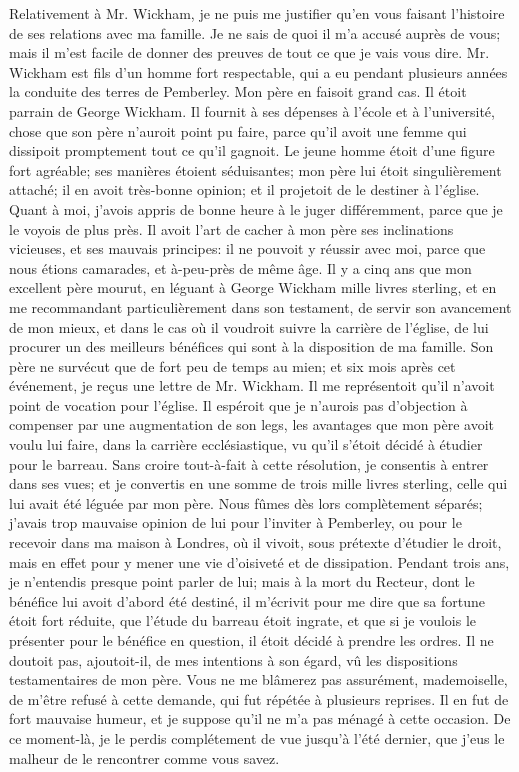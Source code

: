 Relativement à Mr. Wickham, je ne puis me justifier qu'en vous faisant l'histoire de ses relations avec ma famille. Je ne sais de quoi il m'a accusé auprès de vous; mais il m'est facile de donner des preuves de tout ce que je vais vous dire. Mr. Wickham est fils d'un homme fort respectable, qui a eu pendant plusieurs années la conduite des terres de Pemberley. Mon père en faisoit grand cas. Il étoit parrain de George Wickham. Il fournit à ses dépenses à l'école et à l'université, chose que son père n'auroit point pu faire, parce qu'il avoit une femme qui dissipoit promptement tout ce qu'il gagnoit. Le jeune homme étoit d'une figure fort agréable; ses manières étoient séduisantes; mon père lui étoit singulièrement\setcounter{page}{95} attaché; il en avoit très-bonne opinion; et il projetoit de le destiner à l'église. Quant à moi, j'avois appris de bonne heure à le juger différemment, parce que je le voyois de plus près. Il avoit l'art de cacher à mon père ses inclinations vicieuses, et ses mauvais principes: il ne pouvoit y réussir avec moi, parce que nous étions camarades, et à-peu-près de même âge.
Il y a cinq ans que mon excellent père mourut, en léguant à George Wickham mille livres sterling, et en me recommandant particulièrement dans son testament, de servir son avancement de mon mieux, et dans le cas où il voudroit suivre la carrière de l'église, de lui procurer un des meilleurs bénéfices qui sont à la disposition de ma famille. Son père ne survécut que de fort peu de temps au mien; et six mois après cet événement, je reçus une lettre de Mr. Wickham. Il me représentoit qu'il n'avoit point de vocation pour l'église. Il espéroit que je n'aurois pas d'objection à compenser par une augmentation de son legs, les avantages que mon père avoit voulu lui faire, dans la carrière ecclésiastique, vu qu'il s'étoit décidé à étudier pour le barreau. Sans croire tout-à-fait à cette résolution, je consentis à entrer dans ses vues; et je convertis en une somme\setcounter{page}{96} de trois mille livres sterling, celle qui lui avait été léguée par mon père. Nous fûmes dès lors complètement séparés; j'avais trop mauvaise opinion de lui pour l'inviter à Pemberley, ou pour le recevoir dans ma maison à Londres, où il vivoit, sous prétexte d'étudier le droit, mais en effet pour y mener une vie d'oisiveté et de dissipation.
Pendant trois ans, je n'entendis presque point parler de lui; mais à la mort du Recteur, dont le bénéfice lui avoit d'abord été destiné, il m'écrivit pour me dire que sa fortune étoit fort réduite, que l'étude du barreau étoit ingrate, et que si je voulois le présenter pour le bénéfice en question, il étoit décidé à prendre les ordres. Il ne doutoit pas, ajoutoit-il, de mes intentions à son égard, vû les dispositions testamentaires de mon père. Vous ne me blâmerez pas assurément, mademoiselle, de m'être refusé à cette demande, qui fut répétée à plusieurs reprises. Il en fut de fort mauvaise humeur, et je suppose qu'il ne m'a pas ménagé à cette occasion. De ce moment-là, je le perdis complétement de vue jusqu'à l'été dernier, que j'eus le malheur de le rencontrer comme vous savez.
